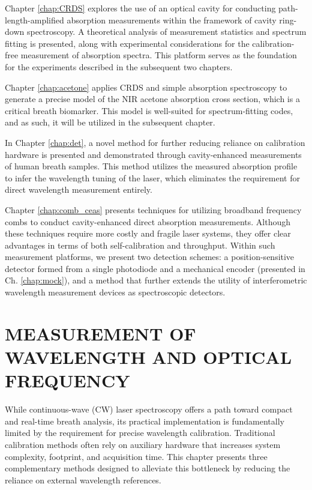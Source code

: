 \documentclass[8pt,a4paper]{report}
\begin{document}
	Chapter \ref{chap:CRDS} explores the use of an optical cavity for conducting path-length-amplified absorption measurements within the framework of cavity ring-down spectroscopy. A theoretical analysis of measurement statistics and spectrum fitting is presented, along with experimental considerations for the calibration-free measurement of absorption spectra. This platform serves as the foundation for the experiments described in the subsequent two chapters.
	
	Chapter \ref{chap:acetone} applies CRDS and simple absorption spectroscopy to generate a precise model of the NIR acetone absorption cross section, which is a critical breath biomarker. This model is well-suited for spectrum-fitting codes, and as such, it will be utilized in the subsequent chapter.
	
	In Chapter \ref{chap:det}, a novel method for further reducing reliance on calibration hardware is presented and demonstrated through cavity-enhanced measurements of human breath samples. This method utilizes the measured absorption profile to infer the wavelength tuning of the laser, which eliminates the requirement for direct wavelength measurement entirely.
	
	Chapter \ref{chap:comb_ceas} presents techniques for utilizing broadband frequency combs to conduct cavity-enhanced direct absorption measurements. Although these techniques require more costly and fragile laser systems, they offer clear advantages in terms of both self-calibration and throughput. Within such measurement platforms, we present two detection schemes: a position-sensitive detector formed from a single photodiode and a mechanical encoder (presented in Ch. \ref{chap:mock}), and a method that further extends the utility of interferometric wavelength measurement devices as spectroscopic detectors.
	
	
		
	\chapter{MEASUREMENT OF WAVELENGTH AND OPTICAL FREQUENCY} \label{chap:wl}
	While continuous-wave (CW) laser spectroscopy offers a path toward compact and real-time breath analysis, its practical implementation is fundamentally limited by the requirement for precise wavelength calibration. Traditional calibration methods often rely on auxiliary hardware that increases system complexity, footprint, and acquisition time. This chapter presents three complementary methods designed to alleviate this bottleneck by reducing the reliance on external wavelength references.
	
\end{document}
